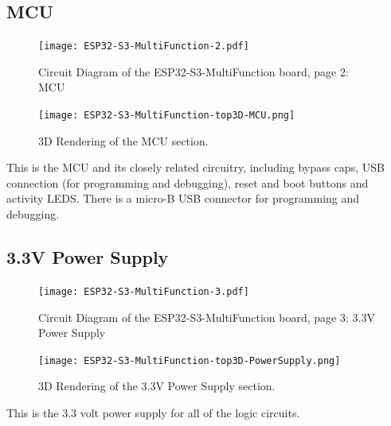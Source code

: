 \subsection{MCU}
\begin{figure}[hbpt]\begin{centering}%
\texttt{[image: ESP32-S3-MultiFunction-2.pdf]}
\caption{Circuit Diagram of the ESP32-S3-MultiFunction board, page 2: MCU}
\end{centering}\end{figure}
\begin{figure}[hbpt]\begin{centering}%
\texttt{[image: ESP32-S3-MultiFunction-top3D-MCU.png]}
\caption{3D Rendering of the MCU section.}
\end{centering}\end{figure}

This is the MCU and its closely related circuitry, including bypass caps, USB 
connection (for programming and debugging), reset and boot buttons and 
activity LEDS.  There is a micro-B USB connector for programming and 
debugging. 

\subsection{3.3V Power Supply}
\begin{figure}[hbpt]\begin{centering}%
\texttt{[image: ESP32-S3-MultiFunction-3.pdf]}
\caption{Circuit Diagram of the ESP32-S3-MultiFunction board, page 3: 3.3V 
Power Supply}
\end{centering}\end{figure}
\begin{figure}[hbpt]\begin{centering}%
\texttt{[image: ESP32-S3-MultiFunction-top3D-PowerSupply.png]}
\caption{3D Rendering of the 3.3V Power Supply section.}
\end{centering}\end{figure}

This is the 3.3 volt power supply for all of the logic circuits.


